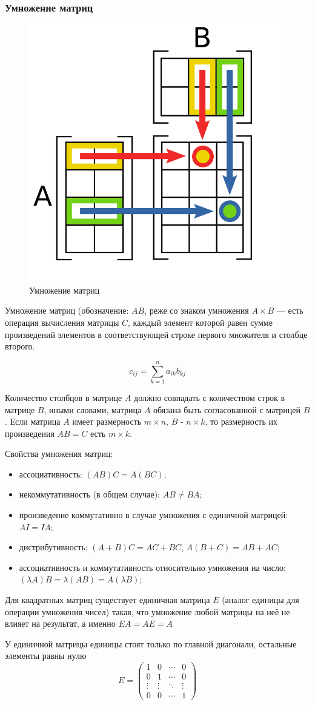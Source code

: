 \documentclass{article}
\begin{document}
\subsubsection*{Умножение матриц}
\begin{figure}
  \includegraphics[width=0.6\linewidth]{matrix-multiplication.png}
  \caption{Умножение матриц}
\end{figure}
Умножение матриц (обозначение: $AB$, реже со знаком умножения $A\times B$ — есть операция вычисления матрицы $C$,
каждый элемент которой равен сумме произведений элементов в соответствующей строке первого множителя и столбце второго.

$$c_{ij}=\sum _{k=1}^{n}a_{ik}b_{kj}$$

Количество столбцов в матрице $A$ должно совпадать с количеством строк в матрице $B$, иными словами, 
матрица $A$ обязана быть согласованной с матрицей $B$. 
Если матрица $A$ имеет размерность $m\times n$, $B$ - $ n\times k$, 
то размерность их произведения $AB=C$ есть $m\times k$.

Свойства умножения матриц:

\begin{itemize}
    \item ассоциативность: $(AB)C = A(BC)$;
    \item некоммутативность (в общем случае): $AB \neq BA$;
    \item произведение коммутативно в случае умножения с единичной матрицей: $AI = IA$;
    \item дистрибутивность: $(A+B)C = AC + BC$, $A(B+C) = AB + AC$;
    \item ассоциативность и коммутативность относительно умножения на число: $(\lambda A)B = \lambda (AB) = A(\lambda B)$;
\end{itemize}

Для квадратных матриц существует единичная матрица $E$ (аналог единицы для операции умножения чисел) такая,
что умножение любой матрицы на неё не влияет на результат, а именно $EA=AE=A$

У единичной матрицы единицы стоят только по главной диагонали, остальные элементы равны нулю
$$E=\begin{pmatrix}1&0&\cdots &0\\0&1&\cdots &0\\\vdots &\vdots &\ddots &\vdots \\0&0&\cdots &1\end{pmatrix}$$
\end{document}
